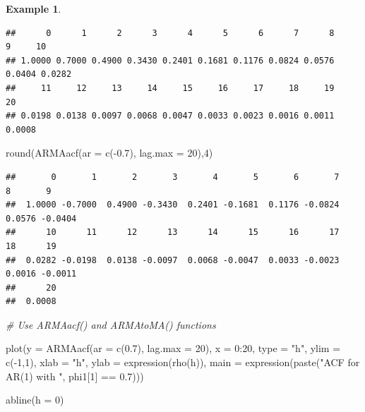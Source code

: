 \documentclass[
]{book}
\newenvironment{Shaded}{\begin{snugshade}}{\end{snugshade}}
\newcommand{\AttributeTok}[1]{\textcolor[rgb]{0.77,0.63,0.00}{#1}}
\newcommand{\CommentTok}[1]{\textcolor[rgb]{0.56,0.35,0.01}{\textit{#1}}}
\newcommand{\DecValTok}[1]{\textcolor[rgb]{0.00,0.00,0.81}{#1}}
\newcommand{\FloatTok}[1]{\textcolor[rgb]{0.00,0.00,0.81}{#1}}
\newcommand{\FunctionTok}[1]{\textcolor[rgb]{0.00,0.00,0.00}{#1}}
\newcommand{\NormalTok}[1]{#1}
\newcommand{\SpecialCharTok}[1]{\textcolor[rgb]{0.00,0.00,0.00}{#1}}
\newcommand{\StringTok}[1]{\textcolor[rgb]{0.31,0.60,0.02}{#1}}
\theoremstyle{definition}
\theoremstyle{definition}
\newtheorem{example}{Example}[chapter]
\theoremstyle{definition}
\theoremstyle{definition}
\theoremstyle{remark}
\begin{document}
\begin{example}
\begin{verbatim}
##      0      1      2      3      4      5      6      7      8      9     10 
## 1.0000 0.7000 0.4900 0.3430 0.2401 0.1681 0.1176 0.0824 0.0576 0.0404 0.0282 
##     11     12     13     14     15     16     17     18     19     20 
## 0.0198 0.0138 0.0097 0.0068 0.0047 0.0033 0.0023 0.0016 0.0011 0.0008
\end{verbatim}

\begin{Shaded}
\begin{Highlighting}[]
\FunctionTok{round}\NormalTok{(}\FunctionTok{ARMAacf}\NormalTok{(}\AttributeTok{ar =} \FunctionTok{c}\NormalTok{(}\SpecialCharTok{{-}}\FloatTok{0.7}\NormalTok{), }\AttributeTok{lag.max =} \DecValTok{20}\NormalTok{),}\DecValTok{4}\NormalTok{) }
\end{Highlighting}
\end{Shaded}

\begin{verbatim}
##       0       1       2       3       4       5       6       7       8       9 
##  1.0000 -0.7000  0.4900 -0.3430  0.2401 -0.1681  0.1176 -0.0824  0.0576 -0.0404 
##      10      11      12      13      14      15      16      17      18      19 
##  0.0282 -0.0198  0.0138 -0.0097  0.0068 -0.0047  0.0033 -0.0023  0.0016 -0.0011 
##      20 
##  0.0008
\end{verbatim}

\begin{Shaded}
\begin{Highlighting}[]
\CommentTok{\# Use ARMAacf() and ARMAtoMA() functions}

\FunctionTok{plot}\NormalTok{(}\AttributeTok{y =} \FunctionTok{ARMAacf}\NormalTok{(}\AttributeTok{ar =} \FunctionTok{c}\NormalTok{(}\FloatTok{0.7}\NormalTok{), }\AttributeTok{lag.max =} \DecValTok{20}\NormalTok{), }\AttributeTok{x =} \DecValTok{0}\SpecialCharTok{:}\DecValTok{20}\NormalTok{, }\AttributeTok{type =} \StringTok{"h"}\NormalTok{, }\AttributeTok{ylim =} \FunctionTok{c}\NormalTok{(}\SpecialCharTok{{-}}\DecValTok{1}\NormalTok{,}\DecValTok{1}\NormalTok{), }\AttributeTok{xlab =} \StringTok{"h"}\NormalTok{, }\AttributeTok{ylab =} \FunctionTok{expression}\NormalTok{(}\FunctionTok{rho}\NormalTok{(h)),}
       \AttributeTok{main =} \FunctionTok{expression}\NormalTok{(}\FunctionTok{paste}\NormalTok{(}\StringTok{"ACF for AR(1) with "}\NormalTok{, phi1[}\DecValTok{1}\NormalTok{] }\SpecialCharTok{==} \FloatTok{0.7}\NormalTok{)))}
  
\FunctionTok{abline}\NormalTok{(}\AttributeTok{h =} \DecValTok{0}\NormalTok{)}
\end{Highlighting}
\end{Shaded}


\end{example}
\end{document}
